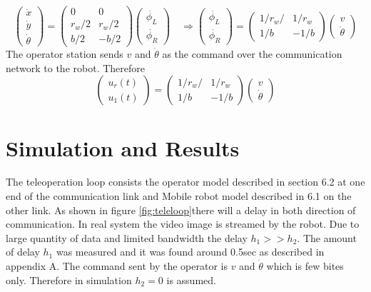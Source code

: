\begin{equation}
\begin{pmatrix}
\dot{x}\\
\dot{y}\\
\dot{\theta}
\end{pmatrix}
=
\begin{pmatrix}
0 & 0 \\
r_w/2 & r_w/2 \\
b/2 & -b/2
\end{pmatrix}
\begin{pmatrix}
\dot{\phi_L}\\
\dot{\phi_R}
\end{pmatrix}
\quad \Rightarrow 
\begin{pmatrix}
\dot{\phi_L}\\
\dot{\phi_R}
\end{pmatrix} =
\begin{pmatrix}
1/r_w/ & 1/r_w \\
1/b & -1/b
\end{pmatrix}
\begin{pmatrix}
v\\
\dot{\theta}
\end{pmatrix}
\end{equation}
The operator station  sends $v$ and $\dot{\theta}$ as the command over the  communication network to the robot. Therefore
\begin{equation}
\begin{pmatrix}
u_r(t)\\
u_1(t)
\end{pmatrix}
=
\begin{pmatrix}
1/r_w/ & 1/r_w \\
1/b & -1/b
\end{pmatrix}
\begin{pmatrix}
v\\
\dot{\theta}
\end{pmatrix}
\end{equation}
  


\section{Simulation and Results }

The teleoperation loop consists the operator model described in section 6.2 at one end of the communication link and Mobile robot model described in 6.1 on the other link. As shown in figure \ref{fig:teleloop}there will a delay in both direction of communication. In real system the video image is streamed  by the robot. Due to large quantity of data and limited bandwidth the delay $h_1>>h_2$. The amount of delay $h_1$ was measured  and it was found around 0.5sec as described in appendix A. The command sent by the operator is  $v$ and $\dot{\theta}$ which is few bites only.  Therefore in simulation  $h_2=0$ is assumed.

